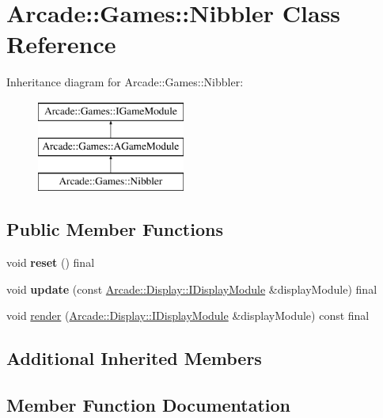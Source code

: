 \hypertarget{classArcade_1_1Games_1_1Nibbler}{}\section{Arcade\+::Games\+::Nibbler Class Reference}
\label{classArcade_1_1Games_1_1Nibbler}
Inheritance diagram for Arcade\+::Games\+::Nibbler\+:\begin{figure}[H]
\begin{center}
\leavevmode
\includegraphics[height=3.000000cm]{classArcade_1_1Games_1_1Nibbler}
\end{center}
\end{figure}
\subsection*{Public Member Functions}
\begin{DoxyCompactItemize}
\item 
\mbox{\label{classArcade_1_1Games_1_1Nibbler_ab07050c302d764a32e42db43664e4687}} 
void {\bfseries reset} () final
\item 
\mbox{\label{classArcade_1_1Games_1_1Nibbler_a6a44a75ab1905647587d7a6314155955}} 
void {\bfseries update} (const \mbox{\hyperlink{classArcade_1_1Display_1_1IDisplayModule}{Arcade\+::\+Display\+::\+I\+Display\+Module}} \&display\+Module) final
\item 
void \mbox{\hyperlink{classArcade_1_1Games_1_1Nibbler_afd52ee2fad66523b58f94f9eb582145e}{render}} (\mbox{\hyperlink{classArcade_1_1Display_1_1IDisplayModule}{Arcade\+::\+Display\+::\+I\+Display\+Module}} \&display\+Module) const final
\end{DoxyCompactItemize}
\subsection*{Additional Inherited Members}


\subsection{Member Function Documentation}
\mbox{\label{classArcade_1_1Games_1_1Nibbler_afd52ee2fad66523b58f94f9eb582145e}} 
